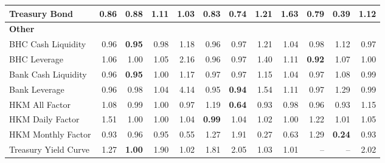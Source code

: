 \begin{tabular}{@{}lrrrrrrrrrrr@{}}
Treasury Bond & 0.86 & 0.88 & 1.11 & 1.03 & 0.83 & 0.74 & 1.21 & 1.63 & 0.79 & \textbf{0.39} & 1.12 \\
\midrule
\multicolumn{12}{l}{\textbf{Other}} \\
BHC Cash Liquidity & 0.96 & \textbf{0.95} & 0.98 & 1.18 & 0.96 & 0.97 & 1.21 & 1.04 & 0.98 & 1.12 & 0.97 \\
BHC Leverage & 1.06 & 1.00 & 1.05 & 2.16 & 0.96 & 0.97 & 1.40 & 1.11 & \textbf{0.92} & 1.07 & 1.00 \\
Bank Cash Liquidity & 0.96 & \textbf{0.95} & 1.00 & 1.17 & 0.97 & 0.97 & 1.15 & 1.04 & 0.97 & 1.08 & 0.99 \\
Bank Leverage & 0.96 & 0.98 & 1.04 & 4.14 & 0.95 & \textbf{0.94} & 1.54 & 1.11 & 0.97 & 1.29 & 0.99 \\
HKM All Factor & 1.08 & 0.99 & 1.00 & 0.97 & 1.19 & \textbf{0.64} & 0.93 & 0.98 & 0.96 & 0.93 & 1.15 \\
HKM Daily Factor & 1.51 & 1.00 & 1.00 & 1.04 & \textbf{0.99} & 1.04 & 1.02 & 1.00 & 1.22 & 1.01 & 1.05 \\
HKM Monthly Factor & 0.93 & 0.96 & 0.95 & 0.55 & 1.27 & 1.91 & 0.27 & 0.63 & 1.29 & \textbf{0.24} & 0.93 \\
Treasury Yield Curve & 1.27 & \textbf{1.00} & 1.90 & 1.02 & 1.81 & 2.05 & 1.03 & 1.01 & -- & -- & 2.02 \\
\bottomrule
\end{tabular}